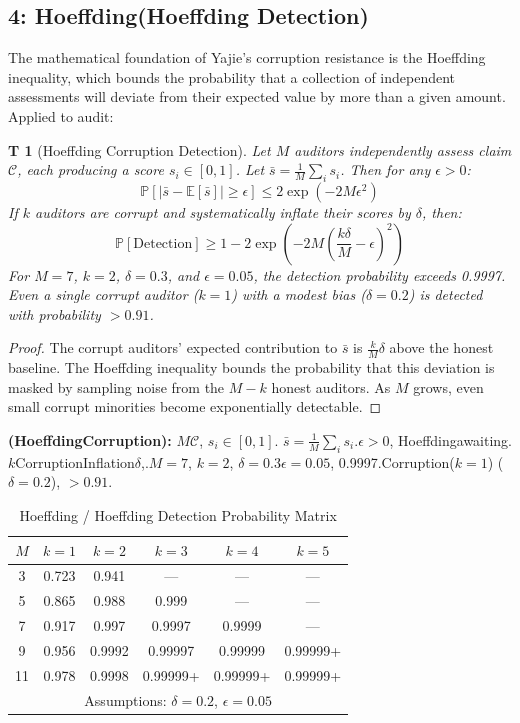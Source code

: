 \documentclass[12pt,a4paper]{article}
\newtheorem{theorem}Theorem[section]
\theoremstyle{remark}
\newcommand{\E}{\mathbb{E}}
\newcommand{\Pbb}{\mathbb{P}}
\begin{document}
\subsection{4: Hoeffding(Hoeffding Detection)}
The mathematical foundation of Yajie's corruption resistance is the Hoeffding inequality, 
which bounds the probability that a collection of independent assessments will deviate 
from their expected value by more than a given amount. Applied to audit:
\begin{theorem}[Hoeffding Corruption Detection]
Let $M$ auditors independently assess claim $\mathcal{C}$, each producing a score 
$s_i \in [0,1]$. Let $\bar{s} = \frac{1}{M}\sum_i s_i$. Then for any $\epsilon > 0$:
\begin{equation}
 \Pbb\left[\left|\bar{s} - \E[\bar{s}]\right| \geq \epsilon \right] \leq 2\exp\left(-2M\epsilon^2\right)
\end{equation}
If $k$ auditors are corrupt and systematically inflate their scores by $\delta$, then:
\begin{equation}
 \Pbb[\text{Detection}] \geq 1 - 2\exp\left(-2M\left(\frac{k\delta}{M} - \epsilon\right)^2\right)
\end{equation}
For $M=7$, $k=2$, $\delta=0.3$, and $\epsilon=0.05$, the detection probability exceeds 
0.9997. Even a single corrupt auditor ($k=1$) with a modest bias ($\delta=0.2$) is 
detected with probability $>0.91$.
\end{theorem}
\begin{proof}
The corrupt auditors' expected contribution to $\bar{s}$ is $\frac{k}{M}\delta$ above 
the honest baseline. The Hoeffding inequality bounds the probability that this deviation 
is masked by sampling noise from the $M-k$ honest auditors. As $M$ grows, even small 
corrupt minorities become exponentially detectable.
\end{proof}
\medskip
\textbf{(HoeffdingCorruption): }
$M$$\mathcal{C}$, $s_i \in [0,1]$.
$\bar{s} = \frac{1}{M}\sum_i s_i$.$\epsilon > 0$, Hoeffdingawaiting.
$k$CorruptionInflation$\delta$,.$M=7$, $k=2$, 
$\delta=0.3$$\epsilon=0.05$, 0.9997.Corruption($k=1$)
($\delta=0.2$), $>0.91$.
\begin{table}[H]
\centering
\caption{Hoeffding / Hoeffding Detection Probability Matrix}
\label{tab:hoeffding}
\begin{tabular}{@{}cccccc@{}}
\toprule
$M$ & $k=1$ & $k=2$ & $k=3$ & $k=4$ & $k=5$ \\
\midrule
3 & 0.723 & 0.941 & --- & --- & --- \\
5 & 0.865 & 0.988 & 0.999 & --- & --- \\
7 & 0.917 & 0.997 & 0.9997 & 0.9999 & --- \\
9 & 0.956 & 0.9992 & 0.99997 & 0.99999 & 0.99999+ \\
11 & 0.978 & 0.9998 & 0.99999+ & 0.99999+ & 0.99999+ \\
\bottomrule
\multicolumn{6}{c}{\small Assumptions: $\delta=0.2$, $\epsilon=0.05$ } \\
\end{tabular}
\end{table}
\end{document}
